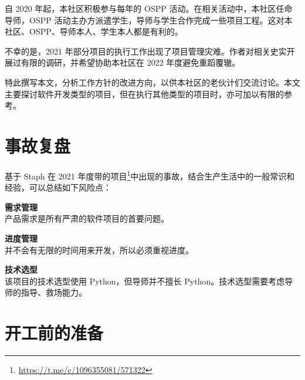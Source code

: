 





\rmfamily









自 2020 年起，本社区积极参与每年的 OSPP 活动。在相关活动中，本社区任命导师，OSPP 活动主办方派遣学生，导师与学生合作完成一些项目工程。这对本社区、OSPP、导师本人、学生本人都是有利的。

不幸的是，2021 年部分项目的执行工作出现了项目管理灾难。作者对相关史实开展过有限的调研，并希望协助本社区在 2022 年度避免重蹈覆辙。

特此撰写本文，分析工作方针的改进方向，以供本社区的老伙计们交流讨论。本文主要探讨软件开发类型的项目，但在执行其他类型的项目时，亦可加以有限的参考。










\section{事故复盘}

基于 Staph 在 2021 年度带的项目\footnote{\href{https://t.me/c/1096355081/571322}{https://t.me/c/1096355081/571322}}中出现的事故，结合生产生活中的一般常识和经验，可以总结如下风险点：

\begin{compactitem}
	\item \textbf{需求管理}\\产品需求是所有严肃的软件项目的首要问题。
	\item \textbf{进度管理}\\并不会有无限的时间用来开发，所以必须重视进度。
	\item \textbf{技术选型}\\该项目的技术选型使用 Python，但导师并不擅长 Python。技术选型需要考虑导师的指导、救场能力。
\end{compactitem}









\section{开工前的准备}

